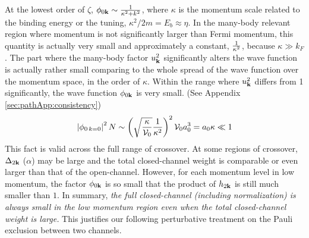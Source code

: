 At the lowest order of $\zeta$, $\phi_{0\mathbf{k}}\sim\frac{1}{\kappa^{2}+k^{2}}$, where $\kappa$ is the momentum scale related to the binding energy or the tuning, $\kappa^{2}/2m=E_{b}\approx\eta$.     In the many-body relevant region where momentum is not significantly larger than Fermi momentum, this quantity is actually very small and approximately a constant, $\frac{1}{\kappa^{2}}$, because $\kappa{}\gg{}k_{F}$.  The part where the many-body factor $u_{\mathbf{k}}^{2}$ significantly alters the wave function is actually rather small comparing to the whole spread of the wave function over the momentum space, in the order of $\kappa$.  Within the range where $u_{\mathbf{k}}^{2}$ differs from 1 significantly, the wave function $\phi_{0\mathbf{k}}$ is very small.  (See Appendix \ref{sec:pathApp:consistency})
\begin{equation*}
\left\lvert{\phi_{0\,k=0}}\right\rvert^{2}N\sim\left(\sqrt{\frac{\kappa}{\mathcal{V}_{0}}}\frac{1}{\kappa^{2}}\right)^{2}\mathcal{V}_{0}a_{0}^{3}={a_{0}\kappa}\ll1
\end{equation*}
 This fact is valid across the full range of crossover.  At some regions of crossover, $\Delta_{2\mathbf{k}}$ ($\alpha$) may be large and the total closed-channel weight is comparable or even larger than that of the open-channel. However, for each momentum level in low  momentum, the factor $\phi_{0\mathbf{k}}$ is so small that the product of $h_{2\mathbf{k}}$ is still much smaller than $1$.  
In summary, \emph{the full closed-channel (including normalization) is always small in the low momentum region  even when the total closed-channel weight is large.}  This justifies our following perturbative treatment on the Pauli exclusion between two channels. 


